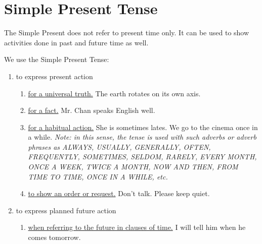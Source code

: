 \section{Simple Present Tense}
The Simple Present does not refer to present time only.
It can be used to show activities done in past and future time as well.

We use the Simple Present Tense:
\begin{enumerate}
    \item to express present action
        \begin{enumerate}
            \item \underline{for a universal truth.}
                \newline
                The earth rotates on its own axis.
            \item \underline{for a fact.}
                \newline
                Mr. Chan speaks English well.
            \item \underline{for a habitual action.}
                \newline
                She is sometimes lates.
                \newline
                We go to the cinema once in a while.
                \newline
                \textit{Note: in this sense, the tense is used with such adverbs
                or adverb phrases as ALWAYS, USUALLY, GENERALLY, OFTEN,
                FREQUENTLY, SOMETIMES, SELDOM, RARELY, EVERY MONTH, ONCE A WEEK,
                TWICE A MONTH, NOW AND THEN, FROM TIME TO TIME, ONCE IN A WHILE,
                etc.}
            \item \underline{to show an order or request.}
                \newline
                Don't talk.
                \newline
                Please keep quiet.
        \end{enumerate}
    \item to express planned future action
        \begin{enumerate}
            \item \underline{when referring to the future in clauses of time.}
                \newline
                I will tell him when he comes tomorrow.

\end{enumerate}
\end{enumerate}
